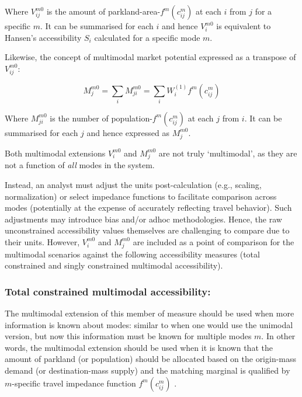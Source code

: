 \documentclass[
11pt, %
oneside, %
english, %
singlespacing, %
]{macthesis} %
\begin{document}
Where \(V^{m0}_{ij}\) is the amount of parkland-area-\(f^{m}(c^{m}_{ij})\) at each \(i\) from \(j\) for a specific \(m\). It can be summarised for each \(i\) and hence \(V^{m0}_i\) is equivalent to Hansen's accessibility \(S_i\) calculated for a specific mode \(m\).

Likewise, the concept of multimodal market potential expressed as a transpose of \(V^{m0}_{ij}\):

\begin{equation}
\label{eq:unconstrained-multimodal-market-park}
M_j^{m0} = \sum_i M^{m0}_{ji} = \sum_i W_i^{(1)} f^m(c^m_{ij})
\end{equation} 

Where \(M^{m0}_{ji}\) is the number of population-\(f^m(c^{m}_{ij})\) at each \(j\) from \(i\). It can be summarised for each \(j\) and hence expressed as \(M^{m0}_j\).

Both multimodal extensions \(V^{m0}_{i}\) and \(M^{m0}_{j}\) are not truly `multimodal', as they are not a function of \emph{all} modes in the system.

Instead, an analyst must adjust the units post-calculation (e.g., scaling, normalization) or select impedance functions to facilitate comparison across modes (potentially at the expense of accurately reflecting travel behavior). Such adjustments may introduce bias and/or adhoc methodologies. Hence, the raw unconstrained accessibility values themselves are challenging to compare due to their units. However, \(V^{m0}_{i}\) and \(M^{m0}_{j}\) are included as a point of comparison for the multimodal scenarios against the following accessibility measures (total constrained and singly constrained multimodal accessibility).

\subsubsection{Total constrained multimodal accessibility:}\label{total-constrained-multimodal-accessibility}

The multimodal extension of this member of measure should be used when more information is known about modes: similar to when one would use the unimodal version, but now this information must be known for multiple modes \(m\). In other words, the multimodal extension should be used when it is known that the amount of parkland (or population) should be allocated based on the origin-mass demand (or destination-mass supply) and the matching marginal is qualified by \(m\)-specific travel impedance function \(f^m(c^m_{ij})\) .
\end{document}
